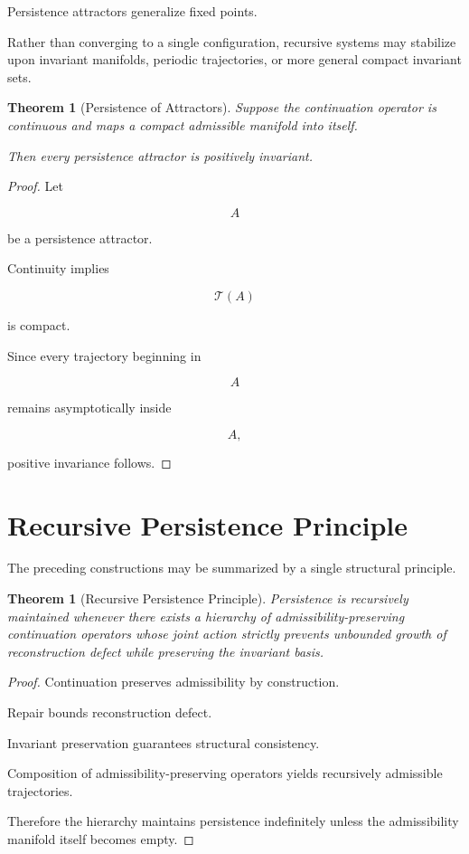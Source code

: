 \documentclass[11pt]{book}
\numberwithin{equation}{chapter}
\theoremstyle{definition}
\theoremstyle{plain}
\newtheorem{theorem}[definition]{Theorem}
\begin{document}
Persistence attractors generalize fixed points.

Rather than converging to a single configuration, recursive systems may
stabilize upon invariant manifolds, periodic trajectories, or more
general compact invariant sets.

\begin{theorem}[Persistence of Attractors]

Suppose the continuation operator is continuous and maps a compact
admissible manifold into itself.

Then every persistence attractor is positively invariant.

\end{theorem}

\begin{proof}

Let

\[
A
\]

be a persistence attractor.

Continuity implies

\[
\mathcal T(A)
\]

is compact.

Since every trajectory beginning in

\[
A
\]

remains asymptotically inside

\[
A,
\]

positive invariance follows.

\end{proof}

\section{Recursive Persistence Principle}

The preceding constructions may be summarized by a single structural
principle.

\begin{theorem}[Recursive Persistence Principle]

Persistence is recursively maintained whenever there exists a hierarchy
of admissibility-preserving continuation operators whose joint action
strictly prevents unbounded growth of reconstruction defect while
preserving the invariant basis.

\end{theorem}

\begin{proof}

Continuation preserves admissibility by construction.

Repair bounds reconstruction defect.

Invariant preservation guarantees structural consistency.

Composition of admissibility-preserving operators yields recursively
admissible trajectories.

Therefore the hierarchy maintains persistence indefinitely unless the
admissibility manifold itself becomes empty.

\end{proof}
\end{document}
